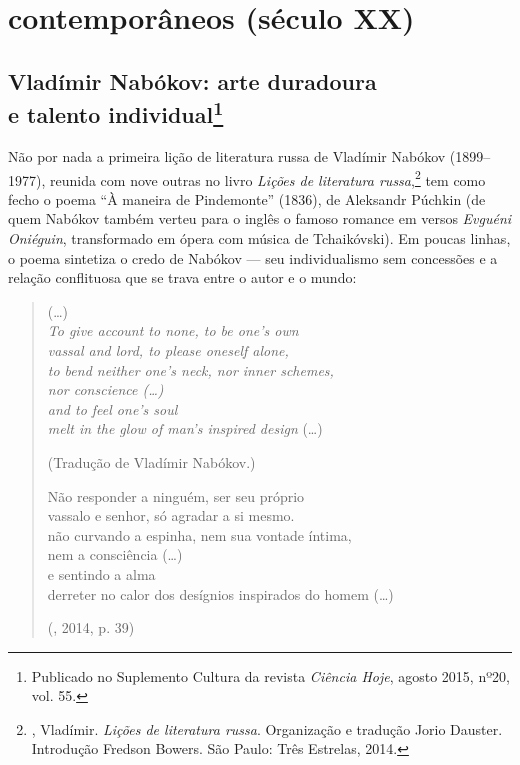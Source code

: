 \part{contemporâneos (século XX)}

\chapter{Vladímir Nabókov: arte duradoura\\ e talento individual\footnote{Publicado no Suplemento Cultura da revista \emph{Ciência Hoje}, agosto 2015, nº20, vol. 55.}}
\label{nabokov}

Não por nada a primeira lição de literatura russa de Vladímir Nabókov
(1899--1977), reunida com nove outras no livro \emph{Lições de
literatura russa},\footnote{, Vladímir. \emph{Lições de literatura russa}. Organização e tradução Jorio Dauster. Introdução Fredson Bowers. São Paulo: Três Estrelas, 2014.} tem como fecho o poema
``À maneira de Pindemonte'' (1836), de Aleksandr Púchkin (de quem Nabókov também verteu para o inglês o famoso romance em versos
\emph{Evguéni Oniéguin}, transformado em ópera com música de Tchaikóvski). Em poucas linhas, o poema sintetiza o credo de Nabókov ---
seu individualismo sem concessões e a relação conflituosa que se trava
entre o autor e o mundo:

\begin{verse}
(\ldots{})\\
\emph{To give account to none, to be one's own \\
vassal and lord, to please oneself alone,\\
to bend neither one's neck, nor inner schemes, \\
nor conscience (\ldots{}) \\
and to feel one's soul \\
melt in the glow of man's inspired design} (\ldots{})

(Tradução de Vladímir Nabókov.)

Não responder a ninguém, ser seu próprio \\
vassalo e senhor, só agradar a si mesmo. \\
não curvando a espinha, nem sua vontade \qb{}íntima, \\
nem a consciência (\ldots{}) \\
e sentindo a alma \\
derreter no calor dos desígnios inspirados \qb{}do homem (\ldots{})

(, 2014, p. 39)
\end{verse}

